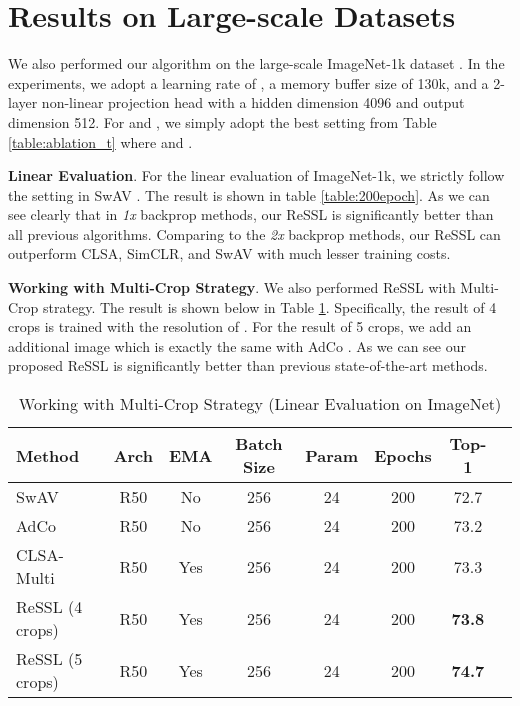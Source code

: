 \documentclass{article}
\newcommand{\<}{\left\langle}
\renewcommand{\>}{\right\rangle}
\begin{document}
\section{Results on Large-scale Datasets}
We also performed our algorithm on the large-scale ImageNet-1k dataset \cite{imagenet_cvpr09}. In the experiments, we adopt a learning rate of , a memory buffer size of 130k, and a 2-layer non-linear projection head with a hidden dimension 4096 and output dimension 512. For  and , we simply adopt the best setting from Table \ref{table:ablation_t} where  and .

\textbf{Linear Evaluation}.
For the linear evaluation of ImageNet-1k, we strictly follow the setting in SwAV \cite{swav}. The result is shown in table \ref{table:200epoch}. As we can see clearly that in \emph{1x} backprop methods, our ReSSL is significantly better than all previous algorithms. Comparing to the \emph{2x} backprop methods, our ReSSL can outperform CLSA, SimCLR, and SwAV with much lesser training costs.

\textbf{Working with Multi-Crop Strategy}.
We also performed ReSSL with Multi-Crop strategy. The result is shown below in Table \ref{table:multi_crop}. Specifically, the result of 4 crops is trained with the resolution of . For the result of 5 crops, we add an additional  image which is exactly the same with AdCo \cite{adco}. As we can see our proposed ReSSL is significantly better than previous state-of-the-art methods.

\begin{table}[h]
 \centering
 \small
 \caption{Working with Multi-Crop Strategy (Linear Evaluation on ImageNet)}
 \label{table:multi_crop}
 \vspace{-5pt}
\begin{tabular}{l  c c c c c c c} 
\toprule 
Method & Arch  & EMA & Batch Size & Param & Epochs & Top-1 \\
\hline
SwAV \cite{swav}                   & R50 & No & 256   & 24 & 200 & 72.7 \\
AdCo \cite{adco}                   & R50 & No & 256   & 24 & 200 & 73.2 \\
CLSA-Multi \cite{stronger}               & R50 & Yes & 256  & 24 & 200 & 73.3 \\
ReSSL (4 crops)                    & R50 & Yes & 256  & 24 & 200 & \textbf{73.8} \\
ReSSL (5 crops)                    & R50 & Yes & 256  & 24 & 200 & \textbf{74.7} \\
\toprule
\end{tabular}
\end{table}
\end{document}
